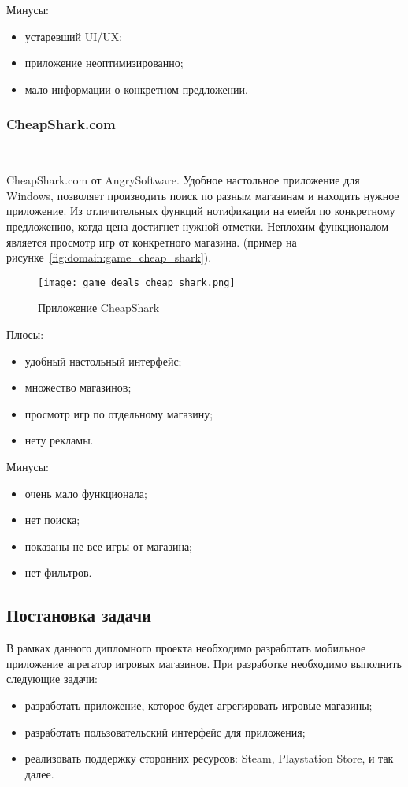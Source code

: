 Минусы:
\begin{itemize}
 \item устаревший UI/UX;
 \item приложение неоптимизированно;
 \item мало информации о конкретном предложении.
\end{itemize}

\subsubsection{CheapShark.com}~\par
CheapShark.com от AngrySoftware. Удобное настольное приложение для Windows, позволяет производить поиск по разным магазинам и находить нужное приложение. Из отличительных функций нотификации на емейл по конкретному предложению, когда цена достигнет нужной отметки. Неплохим функционалом является просмотр игр от конкретного магазина. (пример на рисунке~\ref{fig:domain:game_cheap_shark}).

\begin{figure}[H]
  \centering
    \texttt{[image: game\_deals\_cheap\_shark.png]} 
    \caption{Приложение CheapShark}
    \label{fig:domain:cheap_shark}
 \end{figure}

Плюсы:
\begin{itemize}
  \item удобный настольный интерфейс;
  \item множество магазинов;
  \item просмотр игр по отдельному магазину;
  \item нету рекламы.
\end{itemize}

 Минусы:
 \begin{itemize}
  \item очень мало функционала;
  \item нет поиска;
  \item показаны не все игры от магазина;
  \item нет фильтров.
\end{itemize}
 
\subsection{Постановка задачи}
В рамках данного дипломного проекта необходимо разработать мобильное приложение агрегатор игровых магазинов. При разработке необходимо выполнить следующие задачи:
\begin{itemize}
 \item разработать приложение, которое будет агрегировать игровые магазины;
 \item разработать пользовательский интерфейс для приложения;
 \item реализовать поддержку сторонних ресурсов: Steam, Playstation Store, и так далее.
\end{itemize}
 
